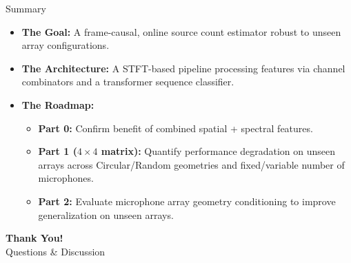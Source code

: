 \documentclass[8pt,hyperref={pdfpagelabels=true},xcolor=table,aspectratio=169]{beamer}
\begin{document}
\begin{frame}{Summary}
    \begin{itemize}
        \item \textbf{The Goal:} A frame-causal, online source count estimator robust to unseen array configurations.
        \item \textbf{The Architecture:} A STFT-based pipeline processing features via channel combinators and a transformer sequence classifier.
        \item \textbf{The Roadmap:}
              \begin{itemize}
                  \item \textbf{Part 0:} Confirm benefit of combined spatial + spectral features.
                  \item \textbf{Part 1 ($4\times4$ matrix):} Quantify performance degradation on unseen arrays across Circular/Random geometries and fixed/variable number of microphones.
                  \item \textbf{Part 2:} Evaluate microphone array geometry conditioning to improve generalization on unseen arrays.
              \end{itemize}
    \end{itemize}
    \vspace{2em}
    \begin{center}
        \textbf{Thank You!} \\
        Questions \& Discussion
    \end{center}
\end{frame}
\end{document}
